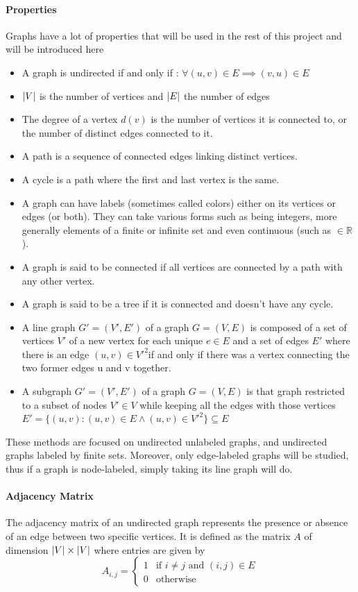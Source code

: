 \documentclass{article}
\DeclarePairedDelimiter{\abs}{\lvert}{\rvert}
\newcommand*{\R}{%
  \mathbb{R}%
}
\theoremstyle{definition}
\begin{document}
\paragraph{Properties} Graphs have a lot of properties that will be used in the rest of this project and will be introduced here
\begin{itemize}
	\item A graph is undirected if and only if : $\forall (u,v) \in E \implies (v,u)\in E$
	\item $\abs{V}$ is the number of vertices and $\abs{E}$ the number of edges
	\item The degree of a vertex $d(v)$ is the number of vertices it is connected to, or the number of distinct edges connected to it.
	\item A path is a sequence of connected edges linking distinct vertices.
	\item A cycle is a path where the first and last vertex is the same.
	\item A graph can have labels (sometimes called colors) either on its vertices or edges (or both). They can take various forms such as being integers, more generally elements of a finite or infinite set and even continuous (such as $\in \R$). 
	\item A graph is said to be connected if all vertices are connected by a path with any other vertex.
	\item A graph is said to be a tree if it is connected and doesn't have any cycle.
	\item A line graph $G'=(V',E')$ of a graph $G=(V,E)$ is composed of a set of vertices $V'$ of a new vertex for each unique $e\in E$ and a set of edges $E'$ where there is an edge $(u,v)\in V'^2$if and only if there was a vertex connecting the two former edges u and v together.
	\item A subgraph $G'=(V',E')$ of a graph $G=(V,E)$ is that graph restricted to a subset of nodes $V' \in V$ while keeping all the edges with those vertices $E' = \{(u,v) : (u,v) \in E \land (u,v) \in V'^{2}\} \subseteq E$
\end{itemize} These methods are focused on undirected unlabeled graphs, and undirected graphs labeled by finite sets. Moreover, only edge-labeled graphs will be studied, thus if a graph is node-labeled, simply taking its line graph will do.
\paragraph{Adjacency Matrix} The adjacency matrix of an undirected graph represents the presence or absence of an edge between two specific vertices. It is defined as the matrix $A$ of dimension $\abs{V}\times\abs{V}$ where entries are given by
\begin{equation}
	A_{i,j}=\left\{
	\begin{matrix}
	1 & \mbox{if } i \neq j \mbox{ and } (i,j) \in E \\
	0 & \mbox{otherwise}
	\end{matrix}
	\right.
\end{equation}
\end{document}
